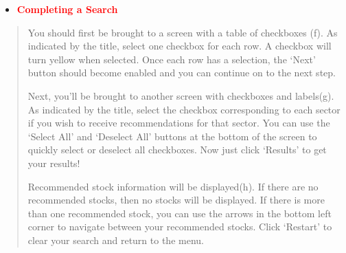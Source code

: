 \documentclass[fontsize=12pt]{article}
\begin{document}
\newpage
\begin{itemize}
\item
\textbf{\textcolor{red}{Completing a Search}}
\end{itemize}
\begin{quote}
\noindent
You should first be brought to a screen with a table of checkboxes (f). As indicated by the title, select one checkbox for each row. A checkbox will turn yellow when selected. Once each row has a selection, the ‘Next’ button should become enabled and you can continue on to the next step.

Next, you’ll be brought to another screen with checkboxes and labels(g). As indicated by the title, select the checkbox corresponding to each sector if you wish to receive recommendations for that sector. You can use the ‘Select All’ and ‘Deselect All’ buttons at the bottom of the screen to quickly select or deselect all checkboxes. Now just click ‘Results’ to get your results!

Recommended stock information will be displayed(h). If there are no recommended stocks, then no stocks will be displayed. If there is more than one recommended stock, you can use the arrows in the bottom left corner to navigate between your recommended stocks. Click ‘Restart’ to clear your search and return to the menu.

\end{quote}
\end{document}

